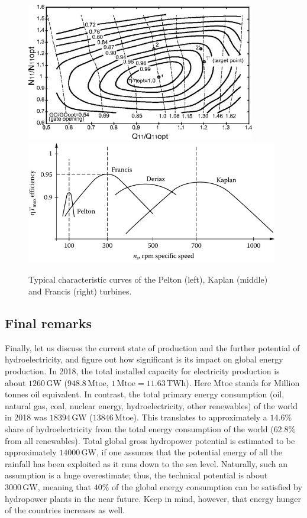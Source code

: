 \begin{figure}[ht!]
	\centering
		\includegraphics[width=10cm]{HydroAndWindPower/Figures/Efficiency_Hill.jpg}\\
		\includegraphics[width=11cm]{HydroAndWindPower/Figures/Efficiency_Of_Turbines.jpg}
	\caption{Typical characteristic curves of the Pelton (left), Kaplan (middle) and Francis (right) turbines.}
	\label{Fig:hill_chart_and_best_efficiency}
\end{figure}

\subsection{Final remarks}
Finally, let us discuss the current state of production and the further potential of hydroelectricity, and figure out how significant is its impact on global energy production. In 2018, the total installed capacity for electricity production is about $1260\,\mathrm{GW}$ ($948.8\,\mathrm{Mtoe}$, $1\,\mathrm{Mtoe}=11.63\,\mathrm{TWh}$). Here Mtoe stands for Million tonnes oil equivalent. In contrast, the total primary energy consumption (oil, natural gas, coal, nuclear energy, hydroelectricity, other renewables) of the world in 2018 was $18394\,\mathrm{GW}$ ($13846\,\mathrm{Mtoe}$). This translates to approximately a $14.6\%$ share of hydroelectricity from the total energy consumption of the world ($62.8\%$ from all renewables). Total global gross hydropower potential is estimated to be approximately $14000\,\mathrm{GW}$, if one assumes that the potential energy of all the rainfall has been exploited as it runs down to the sea level. Naturally, such an assumption is a huge overestimate; thus, the technical potential is about $3000\,\mathrm{GW}$, meaning that $40\%$ of the global energy consumption can be satisfied by hydropower plants in the near future. Keep in mind, however, that energy hunger of the countries increases as well.

